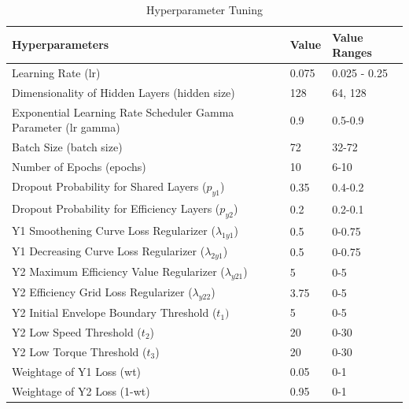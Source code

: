 \documentclass{report} %
\begin{document}
\begin{table}[H]
    \centering
    \begin{tabularx}{\linewidth}{|p{}|p{}|p{}|}
    \hline {\bf Hyperparameters} & {\bf Value} & {\bf Value Ranges}\\
    \hline 
    Learning Rate (lr) & 0.075 & 0.025 - 0.25\\
    Dimensionality of Hidden Layers (hidden size)& 128 & 64, 128\\
    Exponential Learning Rate Scheduler Gamma Parameter (lr gamma)& 0.9 & 0.5-0.9\\
    Batch Size (batch size)& 72 & 32-72\\
    Number of Epochs (epochs)& 10 & 6-10\\
    Dropout Probability for Shared Layers ($p_{y1}$)& 0.35 & 0.4-0.2\\
    Dropout Probability for Efficiency Layers ($p_{y2}$) & 0.2 & 0.2-0.1\\
    Y1 Smoothening Curve Loss Regularizer ($\lambda_{1y1}$) & 0.5 & 0-0.75\\
    Y1 Decreasing Curve Loss Regularizer ($\lambda_{2y1}$)& 0.5 & 0-0.75\\
    Y2 Maximum Efficiency Value Regularizer ($\lambda_{y21}$) & 5 & 0-5\\
    Y2 Efficiency Grid Loss Regularizer ($\lambda_{y22}$) & 3.75 & 0-5\\
    Y2 Initial Envelope Boundary Threshold ($t_{1})$& 5 & 0-5\\
    Y2 Low Speed Threshold ($t_{2}$)& 20 & 0-30\\
    Y2 Low Torque Threshold ($t_{3}$)& 20 & 0-30\\
    Weightage of Y1 Loss (wt)& 0.05 & 0-1\\
    Weightage of Y2 Loss (1-wt)& 0.95 & 0-1\\
    \hline
    \end{tabularx}
    \caption{Hyperparameter Tuning}
    \label{tab:Hyperparameter Tunings}
\end{table}
\end{document}
